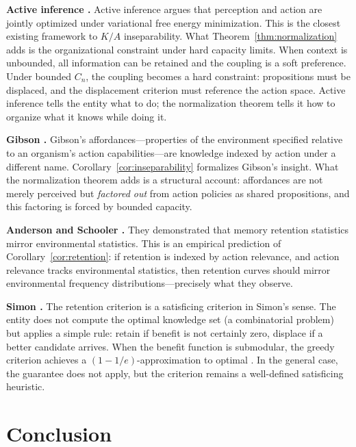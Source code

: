 \documentclass[11pt]{article}
\theoremstyle{definition}
\theoremstyle{remark}
\begin{document}
\textbf{Active inference \cite{Friston2010, ParrPezzuloFriston2022}.}
Active inference argues that perception and action are jointly optimized
under variational free energy minimization. This is the closest existing
framework to $K/A$ inseparability. What
Theorem~\ref{thm:normalization} adds is the organizational constraint
under hard capacity limits. When context is unbounded, all information
can be retained and the coupling is a soft preference. Under bounded
$C_n$, the coupling becomes a hard constraint: propositions must be
displaced, and the displacement criterion must reference the action
space. Active inference tells the entity what to do; the normalization
theorem tells it how to organize what it knows while doing it.

\textbf{Gibson \cite{Gibson1979}.}
Gibson's affordances---properties of the environment specified relative to
an organism's action capabilities---are knowledge indexed by action under
a different name. Corollary~\ref{cor:inseparability} formalizes Gibson's
insight. What the normalization theorem adds is a structural account:
affordances are not merely perceived but \emph{factored out} from action
policies as shared propositions, and this factoring is forced by bounded
capacity.

\textbf{Anderson and Schooler \cite{AndersonSchooler1991}.}
They demonstrated that memory retention statistics mirror environmental
statistics. This is an empirical prediction of
Corollary~\ref{cor:retention}: if retention is indexed by action
relevance, and action relevance tracks environmental statistics, then
retention curves should mirror environmental frequency
distributions---precisely what they observe.

\textbf{Simon \cite{Simon1955}.}
The retention criterion is a satisficing criterion in Simon's sense.
The entity does not compute the optimal knowledge set (a combinatorial
problem) but applies a simple rule: retain if benefit is not certainly
zero, displace if a better candidate arrives. When the benefit function
is submodular, the greedy criterion achieves a $(1 - 1/e)$-approximation
to optimal \cite{Nemhauser1978}. In the general case, the guarantee does
not apply, but the criterion remains a well-defined satisficing
heuristic.

\section{Conclusion}
\label{sec:conclusion}
\end{document}
